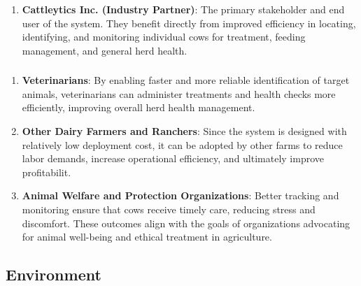 \documentclass{article}
\begin{document}
\subsubsection*{\color{blue}{Direct Stakeholders}}
\begin{enumerate}
    \item\textbf{Cattleytics Inc. (Industry Partner)}: The primary stakeholder 
          and end user of the system. They benefit directly from improved efficiency 
          in locating, identifying, and monitoring individual cows for treatment, 
          feeding management, and general herd health.
    \end{enumerate}


\subsubsection*{\color{blue}{Indirect Stakeholders}}
\begin{enumerate}
    \item \textbf{Veterinarians}: By enabling faster and more reliable identification of target animals, 
            veterinarians can administer treatments and health checks more efficiently, improving overall herd health management.
    \item \textbf{Other Dairy Farmers and Ranchers}: Since the system is designed with relatively low deployment cost, it can be adopted by other farms to reduce 
            labor demands, increase operational efficiency, and ultimately improve profitabilit.
    \item \textbf{Animal Welfare and Protection Organizations}: Better tracking and monitoring ensure that cows receive 
            timely care, reducing stress and discomfort. These outcomes align with the goals of organizations advocating 
            for animal well-being and ethical treatment in agriculture.
\end{enumerate}


\subsection{Environment}
\end{document}
